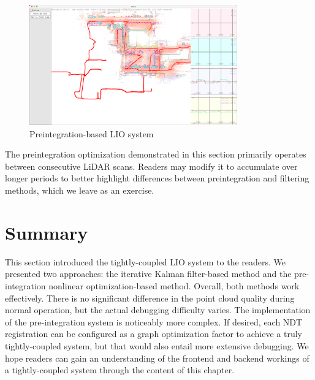 \begin{figure}[!htp]
	\centering
	\includegraphics[width=0.8\textwidth]{resources/lio/lio-preinteg.png}
	\caption{Preintegration-based LIO system}
	\label{fig:lio-preinteg}
\end{figure}

The preintegration optimization demonstrated in this section primarily operates between consecutive LiDAR scans. Readers may modify it to accumulate over longer periods to better highlight differences between preintegration and filtering methods, which we leave as an exercise.

\section{Summary}  
This section introduced the tightly-coupled LIO system to the readers. We presented two approaches: the iterative Kalman filter-based method and the pre-integration nonlinear optimization-based method. Overall, both methods work effectively. There is no significant difference in the point cloud quality during normal operation, but the actual debugging difficulty varies. The implementation of the pre-integration system is noticeably more complex. If desired, each NDT registration can be configured as a graph optimization factor to achieve a truly tightly-coupled system, but that would also entail more extensive debugging. We hope readers can gain an understanding of the frontend and backend workings of a tightly-coupled system through the content of this chapter.  

